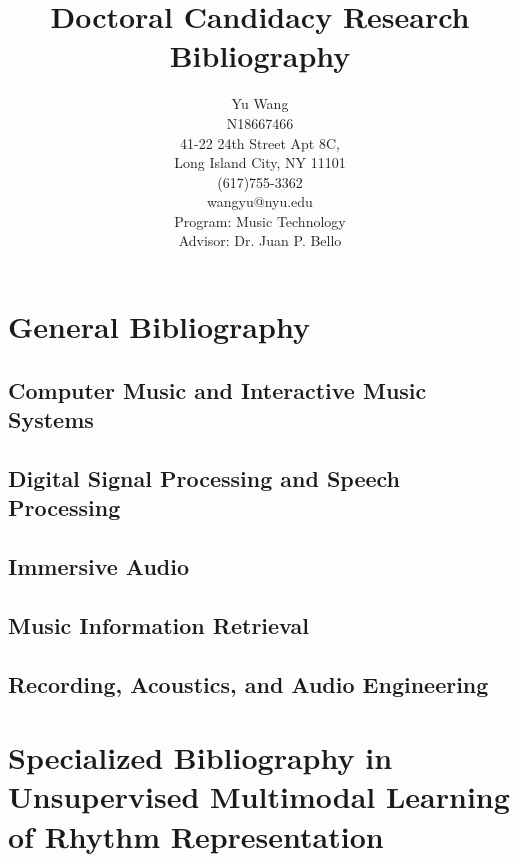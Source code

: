\documentclass [11pt]{article}
\title{Doctoral Candidacy Research Bibliography}
\author{Yu Wang \\ N18667466 \\ 41-22 24th Street Apt 8C,\\ Long Island City, NY 11101 \\ (617)755-3362 \\wangyu@nyu.edu \\Program: Music Technology \\ Advisor: Dr. Juan P. Bello \\}
\begin{document}
\maketitle
\nocite{*}
\section{General Bibliography}
%
%





%
\subsection{Computer Music and Interactive Music Systems}
\subsection{Digital Signal Processing and Speech Processing}
\subsection{Immersive Audio}
\subsection{Music Information Retrieval}
\subsection{Recording, Acoustics, and Audio Engineering}

\section{Specialized Bibliography in Unsupervised Multi\-modal Learning of Rhythm Representation}
\end{document}
